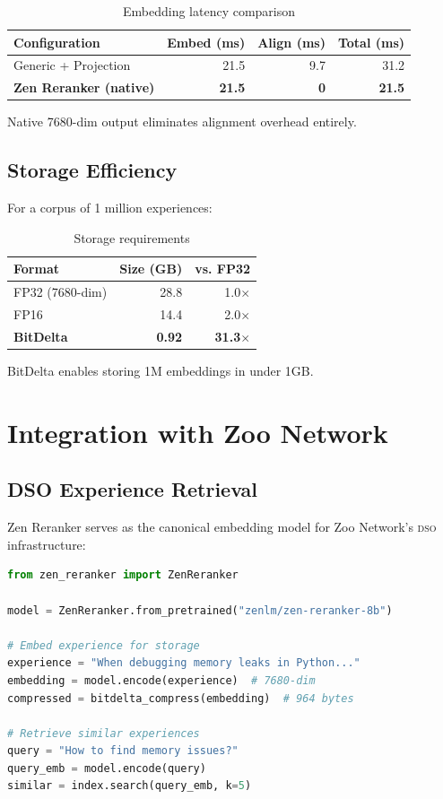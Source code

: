 \documentclass[11pt,letterpaper]{article}
\newcommand{\DSO}{\textsc{dso}}
\begin{document}
\begin{table}[h]
\centering
\caption{Embedding latency comparison}
\label{tab:latency}
\begin{tabular}{lrrr}
\toprule
\textbf{Configuration} & \textbf{Embed (ms)} & \textbf{Align (ms)} & \textbf{Total (ms)} \\
\midrule
Generic + Projection & 21.5 & 9.7 & 31.2 \\
\textbf{Zen Reranker (native)} & \textbf{21.5} & \textbf{0} & \textbf{21.5} \\
\bottomrule
\end{tabular}
\end{table}

Native 7680-dim output eliminates alignment overhead entirely.

\subsection{Storage Efficiency}

For a corpus of 1 million experiences:

\begin{table}[h]
\centering
\caption{Storage requirements}
\label{tab:storage}
\begin{tabular}{lrr}
\toprule
\textbf{Format} & \textbf{Size (GB)} & \textbf{vs. FP32} \\
\midrule
FP32 (7680-dim) & 28.8 & 1.0$\times$ \\
FP16 & 14.4 & 2.0$\times$ \\
\textbf{BitDelta} & \textbf{0.92} & \textbf{31.3$\times$} \\
\bottomrule
\end{tabular}
\end{table}

BitDelta enables storing 1M embeddings in under 1GB.

\section{Integration with Zoo Network}

\subsection{DSO Experience Retrieval}

Zen Reranker serves as the canonical embedding model for Zoo Network's \DSO{} infrastructure:

\begin{lstlisting}[language=Python,basicstyle=\ttfamily\small]
from zen_reranker import ZenReranker

model = ZenReranker.from_pretrained("zenlm/zen-reranker-8b")

# Embed experience for storage
experience = "When debugging memory leaks in Python..."
embedding = model.encode(experience)  # 7680-dim
compressed = bitdelta_compress(embedding)  # 964 bytes

# Retrieve similar experiences
query = "How to find memory issues?"
query_emb = model.encode(query)
similar = index.search(query_emb, k=5)
\end{lstlisting}
\end{document}
